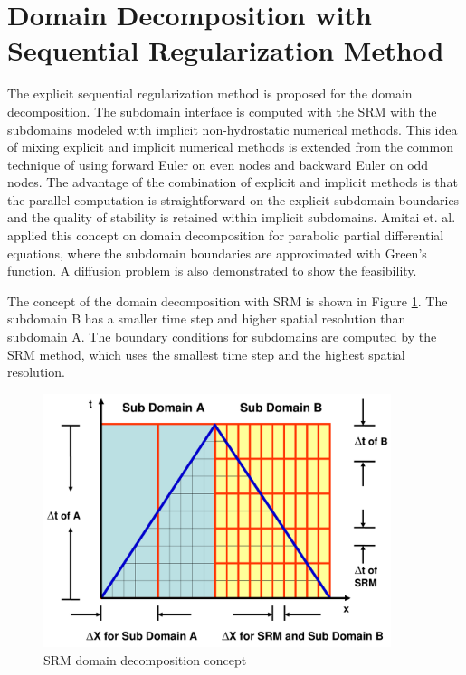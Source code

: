 \cp

\section{Domain Decomposition with Sequential Regularization Method}

The explicit sequential regularization method is proposed for the domain decomposition. The subdomain interface is computed with the SRM with the subdomains modeled with implicit non-hydrostatic numerical methods. This idea of mixing explicit and implicit numerical methods is extended from the common technique of using forward Euler on even nodes and backward Euler on odd nodes. The advantage of the combination of explicit and implicit methods is that the parallel computation is straightforward on the explicit subdomain boundaries and the quality of stability is retained within implicit subdomains. Amitai et. al. \cite{amitai1998} applied this concept on domain decomposition for
parabolic partial differential equations, where the subdomain boundaries are approximated with Green's function. A diffusion problem is also demonstrated to show the feasibility.

The concept of the domain decomposition with SRM is shown in Figure \ref{fig:SRM-DDM}. The subdomain B has a smaller time step and higher spatial resolution than subdomain A. The boundary conditions for subdomains are computed by the SRM method, which uses the smallest time step and the highest spatial resolution.
\begin{figure}[h]
  \begin{center}
    \includegraphics[width=4in]{../figures/SRM/domain.pdf}
    \caption{SRM domain decomposition concept}
    \label{fig:SRM-DDM}
  \end{center}
\end{figure}

